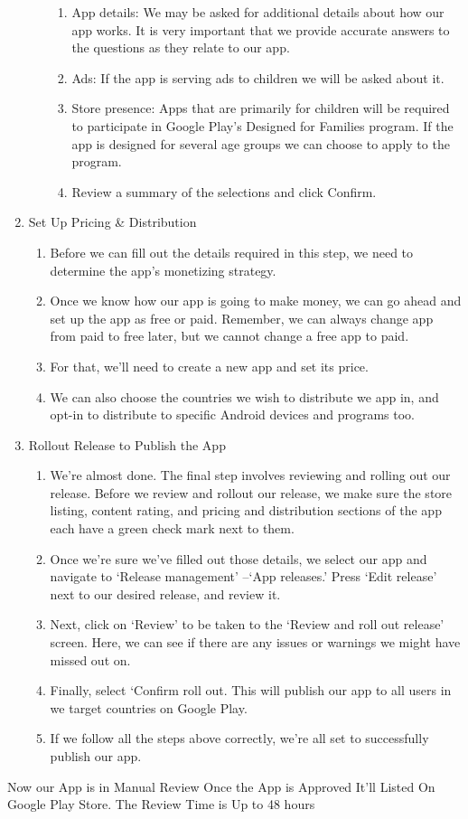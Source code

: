 \begin{enumerate}
\begin{enumerate}
\begin{enumerate}
            \item App details: We may be asked for additional details about how our app works. It is very important that we provide accurate answers to the questions as they relate to our app.
            \item Ads: If the app is serving ads to children we will be asked about it.
            \item Store presence: Apps that are primarily for children will be required to participate in Google Play’s Designed for Families program. If the app is designed for several age groups we can choose to apply to the program.
            \item Review a summary of the selections and click Confirm.
        \end{enumerate}
    \end{enumerate}
    \item Set Up Pricing \& Distribution
    \begin{enumerate}
        \item Before we can fill out the details required in this step, we need to determine the app’s monetizing strategy. 
        \item Once we know how our app is going to make money, we can go ahead and set up the app as free or paid. Remember, we can always change app from paid to free later, but we cannot change a free app to paid.
        \item For that, we’ll need to create a new app and set its price.
        \item We can also choose the countries we wish to distribute we app in, and opt-in to distribute to specific Android devices and programs too.
    \end{enumerate} 
    \item Rollout Release to Publish the App
    \begin{enumerate}
        \item We’re almost done. The final step involves reviewing and rolling out our release. Before we review and rollout our release, we make sure the store listing, content rating, and pricing and distribution sections of the app each have a green check mark next to them.
    \item Once we’re sure we’ve filled out those details,  we select our  app and navigate to ‘Release management’ –‘App releases.’ Press ‘Edit release’ next to our desired release, and review it.
    \item Next, click on ‘Review’ to be taken to the ‘Review and roll out release’ screen. Here, we can see if there are any issues or warnings we might have missed out on.
    \item Finally, select ‘Confirm roll out. This will publish our app to all users in we target countries on Google Play.
    \item If we follow all the steps above correctly, we’re all set to successfully publish our app.
    \end{enumerate}
\end{enumerate}
Now our App is in Manual Review Once the App is Approved It'll Listed On Google Play Store. The Review Time is Up to 48 hours
     

